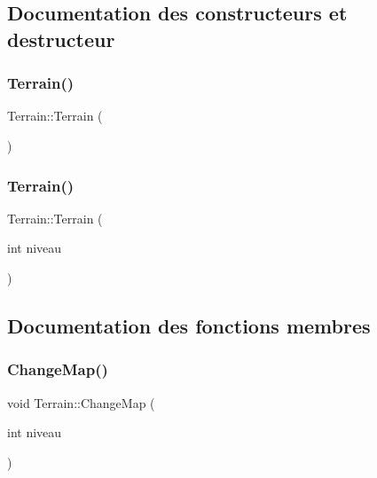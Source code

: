 \subsection{Documentation des constructeurs et destructeur}
\mbox{\label{class_terrain_a7160a06ab07a86ed97d23374405e8ef6}} 
\subsubsection{\texorpdfstring{Terrain()}{Terrain()}\hspace{0.1cm}{\footnotesize\ttfamily [1/2]}}
{\footnotesize\ttfamily Terrain\+::\+Terrain (\begin{DoxyParamCaption}{ }\end{DoxyParamCaption})}

\mbox{\label{class_terrain_a986a374fb1ab7cbe52b3ba68934bae8c}} 
\subsubsection{\texorpdfstring{Terrain()}{Terrain()}\hspace{0.1cm}{\footnotesize\ttfamily [2/2]}}
{\footnotesize\ttfamily Terrain\+::\+Terrain (\begin{DoxyParamCaption}\item[{int}]{niveau }\end{DoxyParamCaption})}



\subsection{Documentation des fonctions membres}
\mbox{\label{class_terrain_a52c2a50f1df6a2b67dc411a5ae76ae68}} 
\subsubsection{\texorpdfstring{Change\+Map()}{ChangeMap()}}
{\footnotesize\ttfamily void Terrain\+::\+Change\+Map (\begin{DoxyParamCaption}\item[{int}]{niveau }\end{DoxyParamCaption})}


